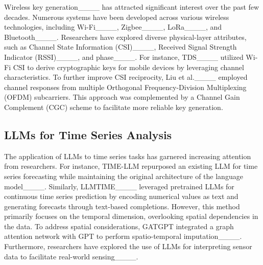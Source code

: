 Wireless key generation____ has attracted significant interest over the past few decades. Numerous systems have been developed across various wireless technologies, including Wi-Fi____, Zigbee____, LoRa____, and Bluetooth____. Researchers have explored diverse physical-layer attributes, such as Channel State Information (CSI)____, Received Signal Strength Indicator (RSSI)____, and phase____.
For instance, TDS____ utilized Wi-Fi CSI to derive cryptographic keys for mobile devices by leveraging channel characteristics. To further improve CSI reciprocity, Liu et al.____ employed channel responses from multiple Orthogonal Frequency-Division Multiplexing (OFDM) subcarriers. This approach was complemented by a Channel Gain Complement (CGC) scheme to facilitate more reliable key generation.

\subsection{LLMs for Time Series Analysis}
The application of LLMs to time series tasks has garnered increasing attention from researchers. For instance, TIME-LLM repurposed an existing LLM for time series forecasting while maintaining the original architecture of the language model____. 
Similarly, LLMTIME____ leveraged pretrained LLMs for continuous time series prediction by encoding numerical values as text and generating forecasts through text-based completions. However, this method primarily focuses on the temporal dimension, overlooking spatial dependencies in the data.
To address spatial considerations, GATGPT integrated a graph attention network with GPT to perform spatio-temporal imputation____. 
Furthermore, researchers have explored the use of LLMs for interpreting sensor data to facilitate real-world sensing____.

